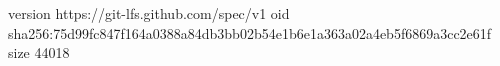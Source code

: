 version https://git-lfs.github.com/spec/v1
oid sha256:75d99fc847f164a0388a84db3bb02b54e1b6e1a363a02a4eb5f6869a3cc2e61f
size 44018
